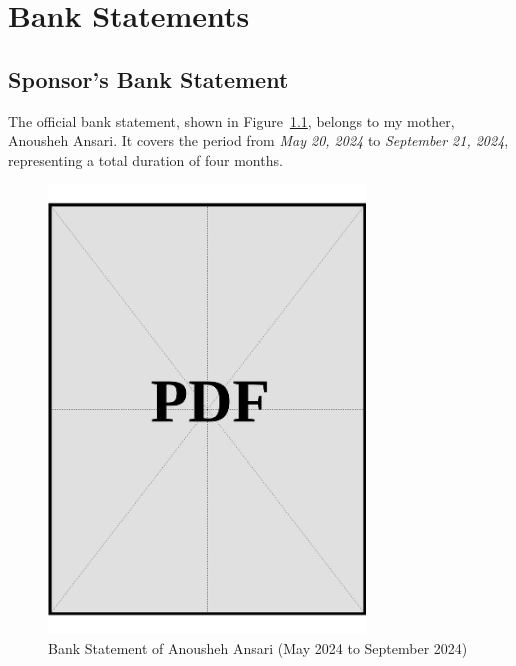 \chapter{Bank Statements}
\label{sec:bank-statements}

\section{Sponsor's Bank Statement}
\label{sec:sponsor-bank-statement}

\noindent
The official bank statement, shown in Figure~\ref{fig:sponsor-bank-statement}, belongs to my mother, Anousheh Ansari. It covers the period from \textit{May 20, 2024} to \textit{September 21, 2024}, representing a total duration of four months.

\vspace*{\fill}
\begin{figure}[h]
    \centering
    \includegraphics[page=1, width=0.75\textwidth]{../docs/sponsor/funds/bank-account/bank-statement.pdf}
    \caption{Bank Statement of Anousheh Ansari (May 2024 to September 2024)}
    \label{fig:sponsor-bank-statement}
\end{figure}
\vspace*{\fill}

